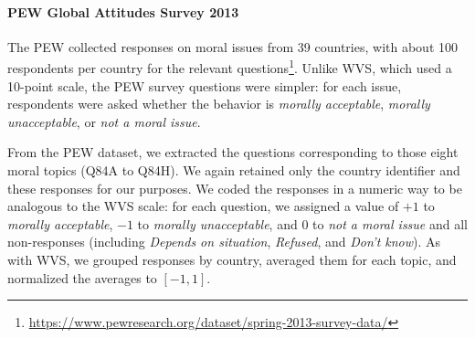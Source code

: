 \documentclass[runningheads]{llncs}
\begin{document}





\paragraph{PEW Global Attitudes Survey 2013} The PEW collected responses on moral issues from 39 countries, with about 100 respondents per country for the relevant questions\footnote{\url{https://www.pewresearch.org/dataset/spring-2013-survey-data/}}. Unlike WVS, which used a 10-point scale, the PEW survey questions were simpler: for each issue, respondents were asked whether the behavior is \emph{morally acceptable}, \emph{morally unacceptable}, or \emph{not a moral issue}.

From the PEW dataset, we extracted the questions corresponding to those eight moral topics (Q84A to Q84H). We again retained only the country identifier and these responses for our purposes. We coded the responses in a numeric way to be analogous to the WVS scale: for each question, we assigned a value of \(+1\) to \emph{morally acceptable}, \(-1\) to \emph{morally unacceptable}, and \(0\) to \emph{not a moral issue} and all non-responses (including \emph{Depends on situation}, \emph{Refused}, and \emph{Don't know}). As with WVS, we grouped responses by country, averaged them for each topic, and normalized the averages to \([-1, 1]\). %


\end{document}
